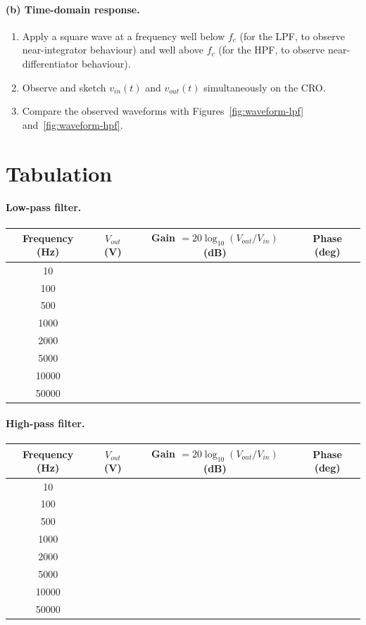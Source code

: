 \paragraph{(b) Time-domain response.}
\begin{enumerate}
	\item Apply a square wave at a frequency well below $f_c$ (for the LPF, to observe near-integrator behaviour) and well above $f_c$ (for the HPF, to observe near-differentiator behaviour).
	\item Observe and sketch $v_{in}(t)$ and $v_{out}(t)$ simultaneously on the CRO.
	\item Compare the observed waveforms with Figures~\ref{fig:waveform-lpf} and~\ref{fig:waveform-hpf}.
\end{enumerate}

\section{Tabulation}

\paragraph{Low-pass filter.}
\begin{center}
	\begin{tabular}{@{}cccc@{}}
		\toprule
		Frequency (Hz) & $V_{out}$ (V) & Gain $= 20\log_{10}(V_{out}/V_{in})$ (dB) & Phase (deg) \\
		\midrule
		10    & & & \\
		100   & & & \\
		500   & & & \\
		1000  & & & \\
		2000  & & & \\
		5000  & & & \\
		10000 & & & \\
		50000 & & & \\
		\bottomrule
	\end{tabular}
\end{center}

\paragraph{High-pass filter.}
\begin{center}
	\begin{tabular}{@{}cccc@{}}
		\toprule
		Frequency (Hz) & $V_{out}$ (V) & Gain $= 20\log_{10}(V_{out}/V_{in})$ (dB) & Phase (deg) \\
		\midrule
		10    & & & \\
		100   & & & \\
		500   & & & \\
		1000  & & & \\
		2000  & & & \\
		5000  & & & \\
		10000 & & & \\
		50000 & & & \\
		\bottomrule
	\end{tabular}
\end{center}
